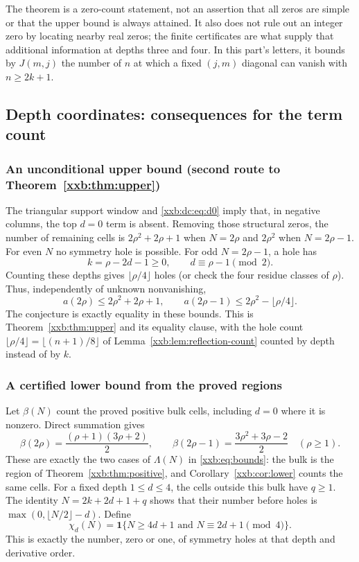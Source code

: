 \documentclass[11pt,a4paper]{article}
\numberwithin{equation}{section}
\theoremstyle{definition}
\theoremstyle{remark}
\theoremstyle{plain}
\begin{document}
The theorem is a zero-count statement, not an assertion that all zeros
are simple or that the upper bound is always attained.  It also does not
rule out an integer zero by locating nearby real zeros; the finite
certificates are what supply that additional information at depths three
and four.  In this part's letters, it bounds by $J(m,j)$ the number of $n$ at
which a fixed $(j,m)$ diagonal can vanish with $n\ge2k+1$.

\subsection{Depth coordinates: consequences for the term count}\label{xxb:dc:sec:counts}

\subsubsection{An unconditional upper bound (second route to Theorem~\ref{xxb:thm:upper})}
The triangular support window and \eqref{xxb:dc:eq:d0} imply that, in negative
columns, the top $d=0$ term is absent.  Removing those structural zeros,
the number of remaining cells is
$2\rho^2+2\rho+1$ when $N=2\rho$ and $2\rho^2$ when $N=2\rho-1$.
For even $N$ no symmetry hole is possible.  For odd $N=2\rho-1$, a hole has
\[
 k=\rho-2d-1\ge0,\qquad d\equiv \rho-1\pmod2.
\]
Counting these depths gives $\lfloor \rho/4\rfloor$ holes (or check the four
residue classes of $\rho$).  Thus, independently of unknown nonvanishing,
\begin{equation}\label{xxb:dc:eq:upper}
 a(2\rho)\le2\rho^2+2\rho+1,\qquad
 a(2\rho-1)\le2\rho^2-\lfloor \rho/4\rfloor.
\end{equation}
The conjecture is exactly equality in these bounds.  This is
Theorem~\ref{xxb:thm:upper} and its equality clause, with the hole count
$\lfloor\rho/4\rfloor=\lfloor(n+1)/8\rfloor$ of
Lemma~\ref{xxb:lem:reflection-count} counted by depth instead of by $k$.

\subsubsection{A certified lower bound from the proved regions}
Let $\beta(N)$ count the proved positive bulk cells, including $d=0$
where it is nonzero.  Direct summation gives
\begin{equation}\label{xxb:dc:eq:B}
 \beta(2\rho)=\frac{(\rho+1)(3\rho+2)}2,\qquad
 \beta(2\rho-1)=\frac{3\rho^2+3\rho-2}2\quad(\rho\ge1).
\end{equation}
These are exactly the two cases of $\Lambda(N)$ in \eqref{xxb:eq:bounds}: the
bulk is the region of Theorem~\ref{xxb:thm:positive}, and
Corollary~\ref{xxb:cor:lower} counts the same cells.
For a fixed depth $1\le d\le4$, the cells outside this bulk have $q\ge1$.
The identity $N=2k+2d+1+q$ shows that their number before holes is
$\max(0,\lfloor N/2\rfloor-d)$.  Define
\begin{equation}\label{xxb:dc:eq:hd}
 \chi_d(N)=\mathbf 1\{N\ge4d+1\text{ and }N\equiv2d+1\pmod4\}.
\end{equation}
This is exactly the number, zero or one, of symmetry holes at that depth
and derivative order.
\end{document}
